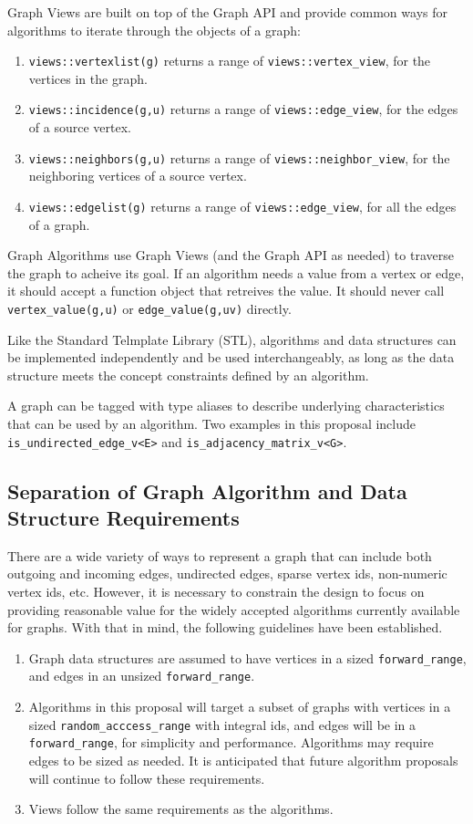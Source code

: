 \documentclass[10pt,onecolumn]{article}
\newcommand{\tcode}[1]{\lstinline{#1}}
\begin{document}
Graph Views are built on top of the Graph API and provide common ways for algorithms to iterate through the objects of a graph:
\begin{enumerate}
\item \tcode{views::vertexlist(g)} returns a range of \tcode{views::vertex_view}, for the vertices in the graph. 
\item \tcode{views::incidence(g,u)} returns a range of \tcode{views::edge_view}, for the edges of a source vertex.
\item \tcode{views::neighbors(g,u)} returns a range of \tcode{views::neighbor_view}, for the neighboring vertices of a source vertex.
\item \tcode{views::edgelist(g)} returns a range of \tcode{views::edge_view}, for all the edges of a graph. 
\end{enumerate}

Graph Algorithms use Graph Views (and the Graph API as needed) to traverse the graph to acheive its goal. If an algorithm needs a value from 
a vertex or edge, it should accept a function object that retreives the value. It should never call \tcode{vertex_value(g,u)} or \tcode{edge_value(g,uv)}
directly.

Like the Standard Telmplate Library (STL), algorithms and data structures can be implemented independently and be used interchangeably,
as long as the data structure meets the concept constraints defined by an algorithm.

A graph can be tagged with type aliases to describe underlying characteristics that can be used by an algorithm. Two examples
in this proposal include \tcode{is_undirected_edge_v<E>} and \tcode{is_adjacency_matrix_v<G>}.

\subsection{Separation of Graph Algorithm and Data Structure Requirements}

There are a wide variety of ways to represent a graph that can include both outgoing and incoming edges, undirected edges,
sparse vertex ids, non-numeric vertex ids, etc. However, it is necessary to constrain the design to focus on providing reasonable 
value for the widely accepted algorithms currently available for graphs. With that in mind, the following guidelines have been established.
\begin{enumerate}
\item Graph data structures are assumed to have vertices in a sized \tcode{forward_range}, and edges in an unsized \tcode{forward_range}.
\item Algorithms in this proposal will target a subset of graphs with vertices in a sized \tcode{random_acccess_range} with 
integral ids, and edges will be in a \tcode{forward_range}, for simplicity and performance. Algorithms may require edges to be sized as
needed. It is anticipated that future algorithm proposals will continue to follow these requirements.
\item Views follow the same requirements as the algorithms.
\end{enumerate}
\end{document}
